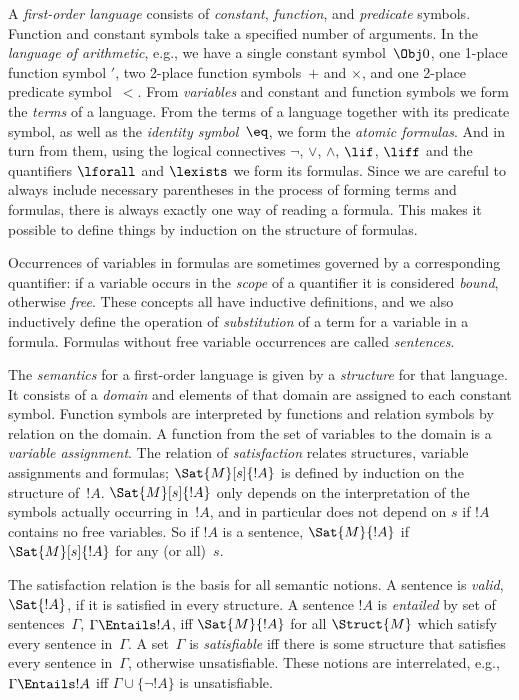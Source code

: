 A \emph{first-order language} consists of \emph{constant},
\emph{function}, and \emph{predicate} symbols. Function and constant
symbols take a specified number of arguments. In the \emph{language
  of arithmetic}, e.g., we have a single constant symbol~$\Obj 0$, one
1-place function symbol $\prime$, two 2-place function symbols~$+$ and
$\times$, and one 2-place predicate symbol~$<$. From \emph{variables}
and constant and function symbols we form the \emph{terms} of a
language. From the terms of a language together with its predicate
symbol, as well as the \emph{identity symbol}~$\eq$, we form the
  \emph{atomic formulas}. And in turn from them, using the logical
  connectives $\lnot$, $\lor$, $\land$, $\lif$, $\liff$ and the
  quantifiers $\lforall$ and $\lexists$ we form its formulas. Since
  we are careful to always include necessary parentheses in the
  process of forming terms and formulas, there is always exactly one
  way of reading a formula. This makes it possible to define things by
  induction on the structure of formulas.

Occurrences of variables in formulas are sometimes governed by a
corresponding quantifier: if a variable occurs in the \emph{scope} of
a quantifier it is considered \emph{bound}, otherwise
\emph{free}. These concepts all have inductive definitions, and we
also inductively define the operation of \emph{substitution} of a term
for a variable in a formula. Formulas without free variable
occurrences are called \emph{sentences}.

The \emph{semantics} for a first-order language is given by a
\emph{structure} for that language. It consists of a \emph{domain} and
elements of that domain are assigned to each constant symbol. Function
symbols are interpreted by functions and relation symbols by relation
on the domain. A function from the set of variables to the domain is
a \emph{variable assignment}. The relation of \emph{satisfaction}
relates structures, variable assignments and formulas;
$\Sat{M}[s]{!A}$ is defined by induction on the structure of~$!A$.
$\Sat{M}[s]{!A}$ only depends on the interpretation of the symbols
actually occurring in~$!A$, and in particular does not depend on $s$
if $!A$ contains no free variables. So if $!A$ is a sentence,
$\Sat{M}{!A}$ if $\Sat{M}[s]{!A}$ for any (or all)~$s$.

The satisfaction relation is the basis for all semantic notions. A
sentence is \emph{valid}, $\Sat{!A}$, if it is satisfied in every
structure. A sentence $!A$ is \emph{entailed} by set of
sentences~$\Gamma$, $\Gamma \Entails !A$, iff $\Sat{M}{!A}$ for all
$\Struct{M}$ which satisfy every sentence in~$\Gamma$. A set~$\Gamma$
is \emph{satisfiable} iff there is some structure that satisfies every
sentence in~$\Gamma$, otherwise unsatisfiable. These notions are
interrelated, e.g., $\Gamma \Entails !A$ iff $\Gamma \cup \{\lnot
!A\}$ is unsatisfiable.
